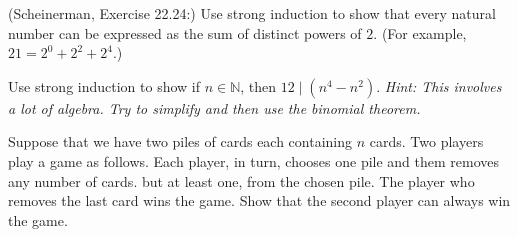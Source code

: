 \documentclass{article}
\theoremstyle{definition}
\begin{document}
\begin{question}
    (Scheinerman, Exercise 22.24:)
    Use strong induction to show that every natural number can be expressed as the sum of distinct powers of $2$.  (For example, $21 = 2^0 + 2^2 + 2^ 4$.)
\end{question}
\begin{solution}
\end{solution}


\begin{question}
    Use strong induction to show if $n\in \mathbb{N}$, then $12\mid (n^4-n^2)$. \textit{Hint: This involves a lot of algebra. Try to simplify and then use the binomial theorem.}
\end{question}
\begin{solution}
\end{solution}



\begin{question}
    Suppose that we have two piles of cards each containing $n$ cards. Two players play a game as follows. Each player, in turn, chooses one pile and them removes any number of cards. but at least one, from the chosen pile. The player who removes the last card wins the game. Show that the second player can always win the game.
\end{question}
\begin{solution}
\end{solution}
\end{document}

